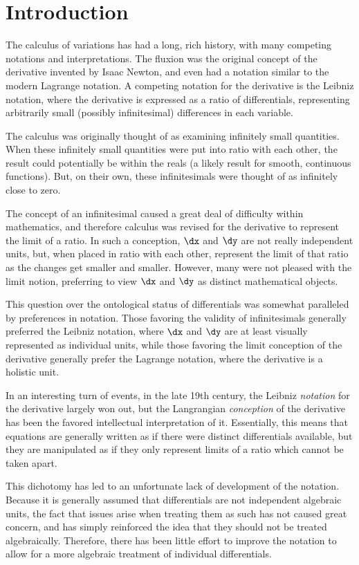
\section{Introduction}

The calculus of variations has had a long, rich history, with many competing notations and interpretations.
The fluxion was the original concept of the derivative invented by Isaac Newton, and even had a notation similar to the modern Lagrange notation.
A competing notation for the derivative is the Leibniz notation, where the derivative is expressed as a ratio of differentials, representing arbitrarily small (possibly infinitesimal) differences in each variable.

The calculus was originally thought of as examining infinitely small quantities.
When these infinitely small quantities were put into ratio with each other, the result could potentially be within the reals (a likely result for smooth, continuous functions).
But, on their own, these infinitesimals were thought of as infinitely close to zero.

The concept of an infinitesimal caused a great deal of difficulty within mathematics, and therefore calculus was revised for the derivative to represent the limit of a ratio.
In such a conception, $\dx$ and $\dy$ are not really independent units, but, when placed in ratio with each other, represent the limit of that ratio as the changes get smaller and smaller.
However, many were not pleased with the limit notion, preferring to view $\dx$ and $\dy$ as distinct mathematical objects.

This question over the ontological status of differentials was somewhat paralleled by preferences in notation.
Those favoring the validity of infinitesimals generally preferred the Leibniz notation, where $\dx$ and $\dy$ are at least visually represented as individual units, while those favoring the limit conception of the derivative generally prefer the Lagrange notation, where the derivative is a holistic unit.

In an interesting turn of events, in the late 19th century, the Leibniz \emph{notation} for the derivative largely won out, but the Langrangian \emph{conception} of the derivative has been the favored intellectual interpretation of it.
Essentially, this means that equations are generally written as if there were distinct differentials available, but they are manipulated as if they only represent limits of a ratio which cannot be taken apart.

This dichotomy has led to an unfortunate lack of development of the notation.
Because it is generally assumed that differentials are not independent algebraic units, the fact that issues arise when treating them as such has not caused great concern, and has simply reinforced the idea that they should not be treated algebraically.
Therefore, there has been little effort to improve the notation to allow for a more algebraic treatment of individual differentials.

